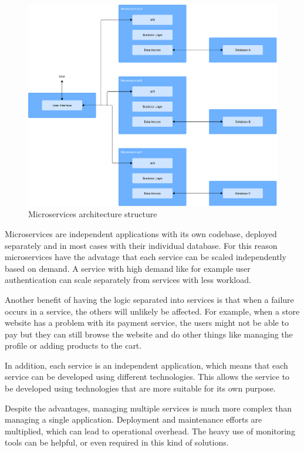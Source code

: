 \begin{figure}[htbp]
	\centering
	\includegraphics[width=\textwidth, height=0.5\textheight, keepaspectratio]{Chapters/Figures/Architectures/microservices.pdf}
	\caption{Microservices architecture structure}
	\label{fig:architectures:microservices}
\end{figure}

Microservices are independent applications with its own codebase, deployed
separately and in most cases with their individual database. For this reason
microservices have the advatage that each service can be scaled independently based on demand. A service with
high demand like for example user authentication can scale separately from
services with less workload\cite{8990350}.

Another benefit of having the logic separated into services is that when
a failure occurs in a service, the others will unlikely be affected. For
example, when a store website has a problem with its payment service, the
users might not be able to pay but they can still browse the website and
do other things like managing the profile or adding products to the cart\cite{8990350}.

In addition, each service is an independent application, which means that each service
can be developed using different technologies\cite{7436659}. This allows the service to
be developed using technologies that are more suitable for its own purpose.

Despite the advantages, managing multiple services is much more complex than managing a single
application\cite{newman2019monolith}. Deployment and maintenance efforts are multiplied, which can
lead to operational overhead. The heavy use of monitoring tools can be
helpful, or even required in this kind of solutions.

